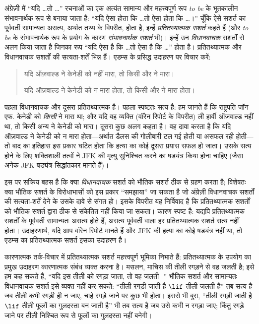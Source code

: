 \documentclass[../../../include/open-logic-section]{subfiles}
\begin{document}


अंग्रेज़ी में ``यदि \dots तो \dots'' रचनाओं का एक अत्यंत सामान्य और
महत्त्वपूर्ण रूप \emph{to be} के भूतकालीन संभावनार्थक रूप से बनाया जाता है:
``यदि ऐसा होता कि \dots तो ऐसा होता कि \dots।'' चूँकि ऐसे सशर्त का
पूर्ववर्ती सामान्यतः असत्य, अर्थात तथ्य के विपरीत, होता है, इन्हें
\emph{प्रतितथ्यात्मक सशर्त} कहते हैं (और \emph{to be} के संभावनार्थक रूप के
प्रयोग के कारण \emph{संभावनार्थक सशर्त} भी)। इन्हें उन \emph{विधानवाचक}
सशर्तों से अलग किया जाता है जिनका रूप ``यदि ऐसा है कि \dots तो ऐसा है कि
\dots'' होता है। प्रतितथ्यात्मक और विधानवाचक सशर्तों की सत्यता-शर्तें भिन्न
हैं। एडम्स के प्रसिद्ध उदाहरण पर विचार करें:
\begin{quote}
  यदि ऑज़वाल्ड ने केनेडी को नहीं मारा, तो किसी और ने मारा।
  
  यदि ऑज़वाल्ड ने केनेडी को न मारा होता, तो किसी और ने मारा होता।
\end{quote}
पहला विधानवाचक और दूसरा प्रतितथ्यात्मक है। पहला स्पष्टतः सत्य है: हम जानते
हैं कि राष्ट्रपति जॉन एफ. केनेडी को \emph{किसी} ने मारा था; और यदि वह
व्यक्ति (वॉरेन रिपोर्ट के विपरीत) ली हार्वी ऑज़वाल्ड नहीं था, तो किसी अन्य
ने केनेडी को मारा। दूसरा कुछ अलग कहता है। वह दावा करता है कि यदि ऑज़वाल्ड
ने केनेडी को न मारा होता---अर्थात डैलस की गोलीबारी टल गई होती या असफल रही
होती---तो बाद का इतिहास इस प्रकार घटित होता कि हत्या का कोई दूसरा प्रयास
सफल हो जाता। उसके सत्य होने के लिए शक्तिशाली तत्वों ने JFK की मृत्यु
सुनिश्चित करने का षड्यंत्र किया होना चाहिए (जैसा अनेक JFK षड्यंत्र-सिद्धांतकार
मानते हैं)।

इस पर सक्रिय बहस है कि क्या \emph{विधानवाचक} सशर्त को भौतिक सशर्त ठीक से
ग्रहण करता है; विशेषतः क्या भौतिक सशर्त के विरोधाभासों को इस प्रकार
``समझाया'' जा सकता है जो अंग्रेज़ी विधानवाचक सशर्तों की सत्यता-शर्तें देने
के उसके दावे से संगत हो। इसके विपरीत यह निर्विवाद है कि प्रतितथ्यात्मक सशर्तों
को भौतिक सशर्त द्वारा ठीक से संकेतित नहीं किया जा सकता। कारण स्पष्ट है:
यद्यपि प्रतितथ्यात्मक सशर्तों के पूर्ववर्ती सामान्यतः असत्य होते हैं, असत्य
पूर्ववर्ती वाला हर प्रतितथ्यात्मक सशर्त सत्य नहीं होता। उदाहरणार्थ, यदि आप
वॉरेन रिपोर्ट मानते हैं और JFK की हत्या का कोई षड्यंत्र नहीं था, तो एडम्स का
प्रतितथ्यात्मक सशर्त इसका उदाहरण है।

कारणात्मक तर्क-विचार में प्रतितथ्यात्मक सशर्त महत्त्वपूर्ण भूमिका निभाते हैं:
प्रतितथ्यात्मक के उपयोग का प्रमुख उदाहरण कारणात्मक संबंध व्यक्त करना है।
मसलन, माचिस की तीली रगड़ने से वह जलती है; इसे हम कह सकते हैं, ``यदि इस तीली
को रगड़ा जाता, तो वह जलती।'' भौतिक सशर्त और सामान्यतः विधानवाचक सशर्त इसे
व्यक्त नहीं कर सकते: ``तीली रगड़ी जाती है $\lif$ तीली जलती है'' तब सत्य है
जब तीली कभी रगड़ी ही न जाए, चाहे रगड़े जाने पर कुछ भी होता। इससे भी बुरा,
``तीली रगड़ी जाती है $\lif$ तीली फूलों का गुलदस्ता बन जाती है'' भी तब सत्य
है जब उसे कभी न रगड़ा जाए; किंतु रगड़े जाने पर तीली निश्चित रूप से फूलों का
गुलदस्ता नहीं बनेगी।
\end{document}
